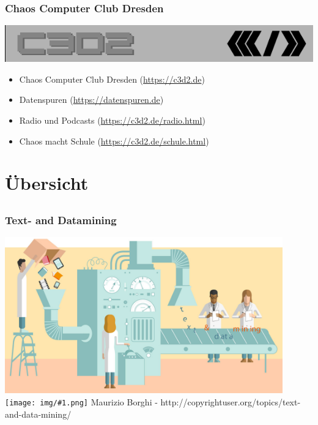 \documentclass[12pt]{beamer}
\newcommand{\cc}[1]{\texttt{[image: img/\#1.png]}\hspace{1mm}}
\begin{document}
\begin{frame}
  \frametitle{Chaos Computer Club Dresden}
  \begin{center}
    \includegraphics[height=0.1\textheight]{img/c3d2_logo.png}
  \end{center}
  \begin{itemize}
    \item<1-> Chaos Computer Club Dresden (\url{https://c3d2.de})          
    \item<2-> Datenspuren (\url{https://datenspuren.de})
    \item<3-> Radio und Podcasts (\url{https://c3d2.de/radio.html})
    \item<4-> Chaos macht Schule (\url{https://c3d2.de/schule.html})
  \end{itemize}
\end{frame}

\section{Übersicht}
\subsection{}

\begin{frame}
  \frametitle{Text- and Datamining}
  \begin{center}
    \includegraphics[width=0.9\textwidth]{img/text_data_mining.jpg} \\
    \tiny \cc{by} Maurizio Borghi - http://copyrightuser.org/topics/text-and-data-mining/
  \end{center}
\end{frame}
\end{document}
